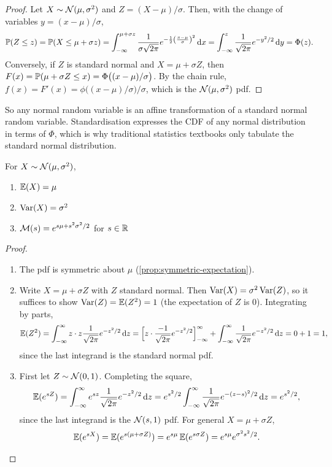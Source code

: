 \begin{proof}
Let $X \sim \mathcal{N}(\mu, \sigma^2)$ and $Z = (X - \mu)/\sigma$. Then, with the change of variables $y = (x - \mu)/\sigma$,
\[
  \mathbb{P}(Z \le z) = \mathbb{P}(X \le \mu + \sigma z) = \int_{-\infty}^{\mu + \sigma z} \frac{1}{\sigma\sqrt{2\pi}} e^{-\frac12 \left(\frac{x-\mu}{\sigma}\right)^2} \mathop{}\!\mathrm{d} x = \int_{-\infty}^z \frac{1}{\sqrt{2\pi}} e^{-y^2/2} \mathop{}\!\mathrm{d} y = \Phi(z).
\]
Conversely, if $Z$ is standard normal and $X = \mu + \sigma Z$, then $F(x) = \mathbb{P}(\mu + \sigma Z \le x) = \Phi\bigl((x - \mu)/\sigma\bigr)$. By the chain rule, $f(x) = F'(x) = \phi\bigl((x - \mu)/\sigma\bigr)/\sigma$, which is the $\mathcal{N}(\mu, \sigma^2)$ pdf.
\end{proof}

So any normal random variable is an affine transformation of a standard normal random variable. Standardisation expresses the CDF of any normal distribution in terms of $\Phi$, which is why traditional statistics textbooks only tabulate the standard normal distribution.

\begin{theorem}\label{thm:normal-properties}
For $X \sim \mathcal{N}(\mu, \sigma^2)$,
\begin{enumerate}
  \item $\operatorname{\mathbb{E}}(X) = \mu$
  \item $\operatorname{Var}(X) = \sigma^2$
  \item $\mathcal{M}(s) = e^{s\mu + s^2\sigma^2/2}$ for $s \in \mathbb{R}$
\end{enumerate}
\end{theorem}

\begin{proof}\leavevmode
\begin{enumerate}[leftmargin=*]
  \item[1.] The pdf is symmetric about $\mu$ (\cref{prop:symmetric-expectation}).
  \item[2.] Write $X = \mu + \sigma Z$ with $Z$ standard normal. Then $\operatorname{Var}(X) = \sigma^2 \operatorname{Var}(Z)$, so it suffices to show $\operatorname{Var}(Z) = \operatorname{\mathbb{E}}(Z^2) = 1$ (the expectation of $Z$ is 0). Integrating by parts,
\[
  \operatorname{\mathbb{E}}(Z^2) = \int_{-\infty}^\infty z \cdot z \frac{1}{\sqrt{2\pi}} e^{-z^2/2} \mathop{}\!\mathrm{d} z = \Bigl[z \cdot \frac{-1}{\sqrt{2\pi}} e^{-z^2/2}\Bigr]_{-\infty}^\infty + \int_{-\infty}^\infty \frac{1}{\sqrt{2\pi}} e^{-z^2/2} \mathop{}\!\mathrm{d} z = 0 + 1 = 1,
\]
since the last integrand is the standard normal pdf.
  \item[3.] First let $Z \sim \mathcal{N}(0, 1)$. Completing the square,
\[
  \operatorname{\mathbb{E}}(e^{sZ}) = \int_{-\infty}^\infty e^{sz} \frac{1}{\sqrt{2\pi}} e^{-z^2/2} \mathop{}\!\mathrm{d} z = e^{s^2/2} \int_{-\infty}^\infty \frac{1}{\sqrt{2\pi}} e^{-(z - s)^2/2} \mathop{}\!\mathrm{d} z = e^{s^2/2},
\]
since the last integrand is the $\mathcal{N}(s, 1)$ pdf. For general $X = \mu + \sigma Z$,
\[
  \operatorname{\mathbb{E}}(e^{sX}) = \operatorname{\mathbb{E}}(e^{s(\mu + \sigma Z)}) = e^{s\mu} \operatorname{\mathbb{E}}(e^{s\sigma Z}) = e^{s\mu} e^{\sigma^2 s^2/2}. \qedhere
  \]
\end{enumerate}
\end{proof}

